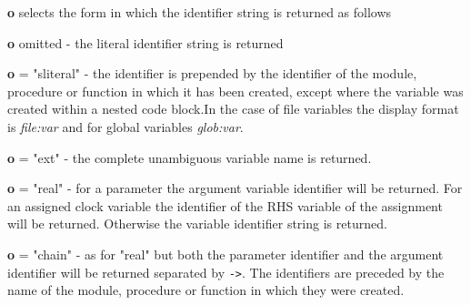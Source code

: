         {\bf o} selects the form in which the identifier string is returned as follows
        
        {\bf o} omitted - the literal identifier string is returned
        
        {\bf o} = "sliteral" - the identifier is prepended by the identifier of the module,
        procedure or function in which it has been created, except where the variable
        was created within a nested code block.In the case of file variables the
        display format is {\em file:var} and for global variables {\em glob:var}.
        
        {\bf o} = "ext" - the complete unambiguous variable name is returned.
        
        {\bf o} = "real" - for a parameter the argument variable identifier will be returned.
        For an assigned clock variable the identifier of the RHS variable of the assignment
        will be returned. Otherwise the variable identifier string is returned.
        
        {\bf o} = "chain" - as for "real" but both the parameter identifier and the argument identifier
        will be returned separated by \verb'->'. The identifiers are preceded by the name of the
        module, procedure or function in which they were created.


